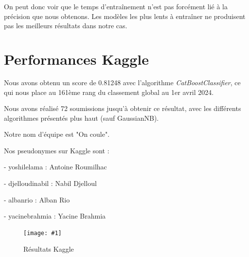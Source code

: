 \documentclass[a4paper]{article}
\newcommand{\illustration}[3]{
    \begin{figure}[h!]
        \centering
        \texttt{[image: \#1]}
        \caption{#2}
    \end{figure}
}
\begin{document}
    On peut donc voir que le temps d'entraînement n'est pas forcément lié à la précision que nous obtenons.
    Les modèles les plus lents à entraîner ne produisent pas les meilleurs résultats dans notre cas.

    \newpage

    \section{Performances Kaggle}

    Nous avons obtenu un score de 0.81248 avec l'algorithme {\it CatBoostClassifier}, ce qui nous place au 161ème rang du classement global au 1er avril 2024.

    Nous avons réalisé 72 soumissions jusqu'à obtenir ce résultat, avec les différents algorithmes présentés plus haut (sauf GaussianNB).

    Notre nom d'équipe est "On coule".

    Nos pseudonymes sur Kaggle sont :

    - yoshilelama : Antoine Roumilhac
    
    - djelloudinabil : Nabil Djelloul

    - albanrio : Alban Rio

    - yacinebrahmia : Yacine Brahmia

    \illustration{images/kaggle.png}{Résultats Kaggle}{\textwidth}
\end{document}
